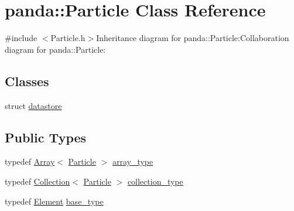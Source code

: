 \hypertarget{classpanda_1_1Particle}{
\section{panda::Particle Class Reference}
\label{classpanda_1_1Particle}
}


{\ttfamily \#include $<$Particle.h$>$}Inheritance diagram for panda::Particle:Collaboration diagram for panda::Particle:\subsection*{Classes}
\begin{DoxyCompactItemize}
\item 
struct \hyperlink{structpanda_1_1Particle_1_1datastore}{datastore}
\end{DoxyCompactItemize}
\subsection*{Public Types}
\begin{DoxyCompactItemize}
\item 
typedef \hyperlink{classpanda_1_1Array}{Array}$<$ \hyperlink{classpanda_1_1Particle}{Particle} $>$ \hyperlink{classpanda_1_1Particle_ac7774202a46a6e99815ebbda009cdeff}{array\_\-type}
\item 
typedef \hyperlink{classpanda_1_1Collection}{Collection}$<$ \hyperlink{classpanda_1_1Particle}{Particle} $>$ \hyperlink{classpanda_1_1Particle_a5c7d779f6db770bcc94cfe63c42b59d2}{collection\_\-type}
\item 
typedef \hyperlink{classpanda_1_1Element}{Element} \hyperlink{classpanda_1_1Particle_a0055c0e7a7015a0446f6c4f8e6f1d469}{base\_\-type}
\end{DoxyCompactItemize}
